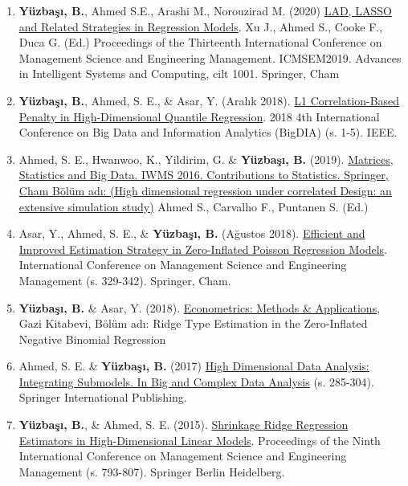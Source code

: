 \documentclass[10pt,a4paper]{article}
\newenvironment{etaremune}{\begin{enumerate}}{\end{enumerate}}
\begin{document}
\begin{etaremune}
\item {\bf Y\"{u}zba\c{s}{\i}, B.}, Ahmed S.E., Arashi M., Norouzirad M. (2020) \href{https://link.springer.com/chapter/10.1007/978-3-030-21248-3_32}{LAD, LASSO and Related Strategies in Regression Models}. Xu J., Ahmed S., Cooke F., Duca G. (Ed.) Proceedings of the Thirteenth International Conference on Management Science and Engineering Management. ICMSEM2019. Advances in Intelligent Systems and Computing, cilt 1001. Springer, Cham



\item {\bf Y\"{u}zba\c{s}{\i}, B.}, Ahmed, S. E., \& Asar, Y. (Aralık 2018). \href{https://ieeexplore.ieee.org/document/8632795}{L1 Correlation-Based Penalty in High-Dimensional Quantile Regression}. 2018 4th International Conference on Big Data and Information Analytics (BigDIA) (s. 1-5). IEEE.


 \item  Ahmed, S. E., Hwanwoo, K., Yildirim, G. \& {\bf Y\"{u}zba\c{s}{\i}, B.} (2019). \href{https://link.springer.com/chapter/10.1007/978-3-030-17519-1_11}{Matrices, Statistics and Big Data. IWMS 2016. Contributions to Statistics. Springer, Cham Bölüm adı: (High dimensional regression under correlated Design: an extensive simulation study)} Ahmed S., Carvalho F., Puntanen S. (Ed.)
 

 
 

 \item  Asar, Y., Ahmed, S. E., \& {\bf Y\"{u}zba\c{s}{\i}, B.} (Ağustos 2018). \href{https://link.springer.com/chapter/10.1007/978-3-319-93351-1_27}{Efficient and Improved Estimation Strategy in Zero-Inflated Poisson Regression Models}. International Conference on Management Science and Engineering Management (s. 329-342). Springer, Cham.


 \item  {\bf Y\"{u}zba\c{s}{\i}, B.}  \& Asar, Y. (2018). \href{https://www.gazikitabevi.com.tr/urun/econometrics-methods-applications}{Econometrics: Methods \& Applications}, Gazi Kitabevi, Bölüm adı: Ridge Type Estimation in the Zero-Inflated Negative Binomial Regression






\item Ahmed, S. E. \& {\bf Y\"{u}zba\c{s}{\i}, B.} (2017) 
\href{https://link.springer.com/chapter/10.1007\%2F978-3-319-41573-4_14}
{High Dimensional Data Analysis: Integrating Submodels. In Big and Complex Data Analysis} (s. 285-304). 
Springer International Publishing.


 \item {\bf Y\"{u}zba\c{s}{\i}, B.}, \& Ahmed, S. E. (2015). 
 \href{https://link.springer.com/chapter/10.1007/978-3-662-47241-5_67}
 {Shrinkage Ridge Regression Estimators in High-Dimensional Linear Models}. 
 Proceedings of the Ninth International Conference on Management Science and Engineering Management (s. 793-807). 
 Springer Berlin Heidelberg.
 

 
 
\end{etaremune}
\end{document}
